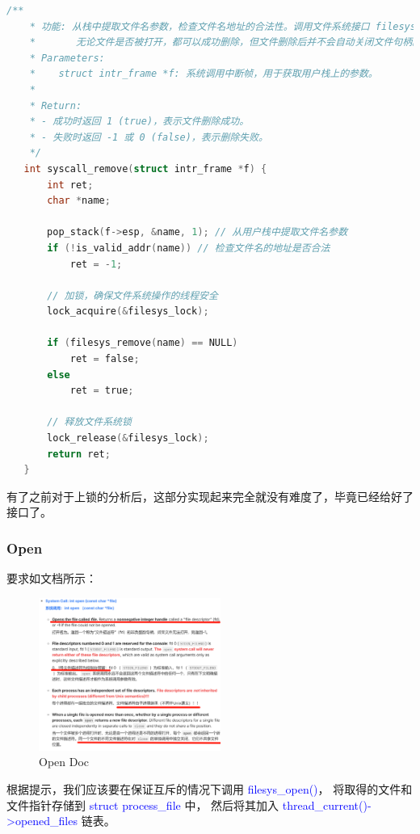 \documentclass[14pt,a4paper,UTF8,twoside]{article}
\renewcommand{\texttt}[1]{\textcolor{blue}{\ttfamily #1}}
\begin{document}
\begin{lstlisting}[language=C, title= syscall\_remove()]
    /**
    * 功能: 从栈中提取文件名参数，检查文件名地址的合法性。调用文件系统接口 filesys_remove() 删除文件。
    *       无论文件是否被打开，都可以成功删除，但文件删除后并不会自动关闭文件句柄。
    * Parameters:
    *    struct intr_frame *f: 系统调用中断帧，用于获取用户栈上的参数。
    * 
    * Return:
    * - 成功时返回 1 (true)，表示文件删除成功。
    * - 失败时返回 -1 或 0 (false)，表示删除失败。
    */
   int syscall_remove(struct intr_frame *f) {
       int ret;
       char *name;      

       pop_stack(f->esp, &name, 1); // 从用户栈中提取文件名参数
       if (!is_valid_addr(name)) // 检查文件名的地址是否合法
           ret = -1;
   
       // 加锁，确保文件系统操作的线程安全
       lock_acquire(&filesys_lock);
   
       if (filesys_remove(name) == NULL) 
           ret = false;
       else 
           ret = true;
   
       // 释放文件系统锁
       lock_release(&filesys_lock);
       return ret;
   }
\end{lstlisting}

有了之前对于上锁的分析后，这部分实现起来完全就没有难度了，毕竟已经给好了接口了。

\subsubsection{Open}

要求如文档所示：

\begin{figure}[H]
    \centering
    \includegraphics[width=0.53\textwidth]{img6/opendoc.png}
    \caption{Open Doc}
    \label{fig:open}
\end{figure}

根据提示，我们应该要在保证互斥的情况下调用 \texttt{filesys\_open()}，
将取得的文件和文件指针存储到 \texttt{struct process\_file} 中，
然后将其加入 \texttt{thread\_current()->opened\_files} 链表。
\end{document}

